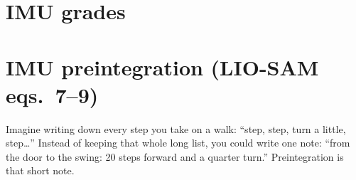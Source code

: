 
\section{IMU grades}


\section{IMU preintegration (LIO-SAM eqs.\ 7--9)}


\begin{kid}
Imagine writing down every step you take on a walk: ``step, step, turn a little, step\ldots'' Instead of keeping that whole long list, you could write one note: ``from the door to the swing: 20 steps forward and a quarter turn.'' Preintegration is that short note.
\end{kid}
